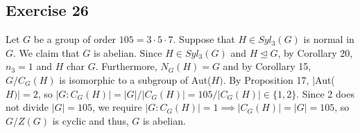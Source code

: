 \subsection*{Exercise 26}
Let $G$ be a group of order $105 = 3\cdot5\cdot7$. Suppose that $H \in Syl_3(G)$ is normal in $G$. We claim that $G$ is abelian. Since $H \in Syl_3(G)$ and $H \trianglelefteq G$, by Corollary 20, $n_3 = 1$ and $H$ char $G$. Furthermore, $N_G(H) = G$ and by Corollary 15, $G/C_G(H)$ is isomorphic to a subgroup of Aut($H)$. By Proposition 17, $|$Aut($H)| = 2$, so $|G:C_G(H)| = |G|/|C_G(H)| = 105/|C_G(H)| \in \{1,2\}.$ Since 2 does not divide $|G| = 105$, we require $|G:C_G(H)| = 1 \implies |C_G(H)| = |G| = 105$, so $G/Z(G)$ is cyclic and thus, $G$ is abelian.